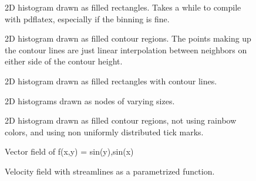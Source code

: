 \documentclass{article}
\begin{document}
\begin{figure}[H]
\centering

\captionsetup{singlelinecheck=off}
\caption[asdf]{2D histogram drawn as filled rectangles. Takes a while to compile with pdflatex, 
especially if the binning is fine.}
\end{figure}
\begin{figure}[H]
\centering

\captionsetup{singlelinecheck=off}
\caption[asdf]{2D histogram drawn as filled contour regions. The points making up the contour lines 
are just linear interpolation between neighbors on either side of the contour height.}
\end{figure}
\begin{figure}[H]
\centering

\captionsetup{singlelinecheck=off}
\caption[asdf]{2D histogram drawn as filled rectangles with contour lines.}
\end{figure}
\begin{figure}[H]
\centering

\captionsetup{singlelinecheck=off}
\caption[asdf]{2D histograms drawn as nodes of varying sizes.}
\end{figure}
\begin{figure}[H]
\centering

\captionsetup{singlelinecheck=off}
\caption[asdf]{2D histogram drawn as filled contour regions, not using rainbow colors, and using
non uniformly distributed tick marks.}
\end{figure}
\begin{figure}[H]
\centering

\captionsetup{singlelinecheck=off}
\caption[asdf]{Vector field of f(x,y) = sin(y),sin(x)}
\end{figure}
\begin{figure}[H]
\centering

\captionsetup{singlelinecheck=off}
\caption[asdf]{Velocity field with streamlines as a parametrized function.}
\end{figure}
\end{document}
